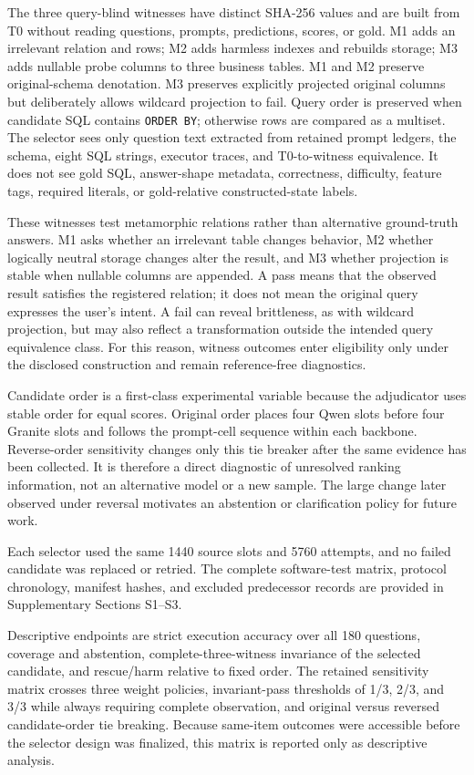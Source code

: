 \documentclass[applsci,article,submit,moreauthors]{Definitions/mdpi}
\begin{document}
The three query-blind witnesses have distinct SHA-256 values and are built from T0 without reading questions, prompts, predictions, scores, or gold. M1 adds an irrelevant relation and rows; M2 adds harmless indexes and rebuilds storage; M3 adds nullable probe columns to three business tables. M1 and M2 preserve original-schema denotation. M3 preserves explicitly projected original columns but deliberately allows wildcard projection to fail. Query order is preserved when candidate SQL contains \texttt{ORDER BY}; otherwise rows are compared as a multiset. The selector sees only question text extracted from retained prompt ledgers, the schema, eight SQL strings, executor traces, and T0-to-witness equivalence. It does not see gold SQL, answer-shape metadata, correctness, difficulty, feature tags, required literals, or gold-relative constructed-state labels.

These witnesses test metamorphic relations rather than alternative ground-truth answers. M1 asks whether an irrelevant table changes behavior, M2 whether logically neutral storage changes alter the result, and M3 whether projection is stable when nullable columns are appended. A pass means that the observed result satisfies the registered relation; it does not mean the original query expresses the user's intent. A fail can reveal brittleness, as with wildcard projection, but may also reflect a transformation outside the intended query equivalence class. For this reason, witness outcomes enter eligibility only under the disclosed construction and remain reference-free diagnostics.

Candidate order is a first-class experimental variable because the adjudicator uses stable order for equal scores. Original order places four Qwen slots before four Granite slots and follows the prompt-cell sequence within each backbone. Reverse-order sensitivity changes only this tie breaker after the same evidence has been collected. It is therefore a direct diagnostic of unresolved ranking information, not an alternative model or a new sample. The large change later observed under reversal motivates an abstention or clarification policy for future work.

Each selector used the same 1440 source slots and 5760 attempts, and no failed candidate was replaced or retried. The complete software-test matrix, protocol chronology, manifest hashes, and excluded predecessor records are provided in Supplementary Sections S1--S3.

Descriptive endpoints are strict execution accuracy over all 180 questions, coverage and abstention, complete-three-witness invariance of the selected candidate, and rescue/harm relative to fixed order. The retained sensitivity matrix crosses three weight policies, invariant-pass thresholds of 1/3, 2/3, and 3/3 while always requiring complete observation, and original versus reversed candidate-order tie breaking. Because same-item outcomes were accessible before the selector design was finalized, this matrix is reported only as descriptive analysis.
\end{document}
